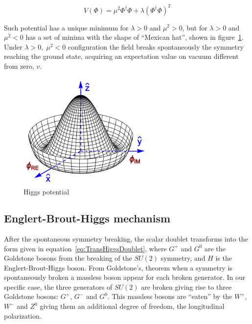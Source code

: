 \begin{equation}
  \label{eq:HiggsPotential}
  V(\Phi)=\mu^{2}\Phi^{\dagger}\Phi+\lambda(\Phi^{\dagger}\Phi)^{2}
\end{equation}

Such potential has a unique minimum for $\lambda>0$ and $\mu^{2}>0$, but for $\lambda>0$ and $\mu^{2}<0$ has a set of minima with the shape of ``Mexican hat'', shown in figure~\ref{fig:MexicanHat}. Under $\lambda>0,\;\mu^{2}<0$ configuration the field breaks spontaneously the symmetry reaching the ground state, acquiring an expectation value on vacuum different from zero, $v$. 

\begin{figure}[!Hhtbp]
  \begin{center}
    \includegraphics[width=0.6\textwidth]{figs/Mexican_hat.png}
    \caption{Higgs potential}
    \label{fig:MexicanHat}
  \end{center}
\end{figure}

\subsection{Englert-Brout-Higgs mechanism}
\label{sec:higgs}

After the spontaneous symmetry breaking, the scalar doublet transforms into the form given in equation~\ref{eq:TransHiggsDoublet}, where $G^{+}$ and $G^{0}$ are the Goldstone bosons from the breaking of the $SU(2)$ symmetry, and $H$ is the Englert-Brout-Higgs boson. From Goldstone's, theorem when a symmetry is spontaneously broken a massless boson appear for each broken generator. In our specific case, the three generators of $SU(2)$ are broken giving rise to three Goldstone bosons: $G^{+}$, $G^{-}$ and $G^{0}$. This massless bosons are ``eaten'' by the $W^{+}$, $W^{-}$ and $Z^{0}$ giving them an additional degree of freedom, the longitudinal polarization. 

